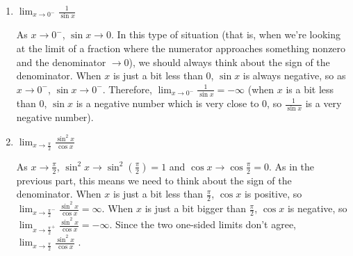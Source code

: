 \documentclass[main]{subfiles}
\begin{document}
\begin{enumerate}
\begin{enumerate}
    \item


      \begin{problem}[\vfill]
        $\displaystyle \lim_{x\to 0^-} \frac{1}{ \sin x}$
      \end{problem}

      \begin{solution}
        As $x \to 0^-$, $\sin x \to 0$.  In this type of situation (that
        is, when we're looking at the limit of a fraction where the
        numerator approaches something nonzero and the denominator $\to
        0$), we should always think about the sign of the denominator.
        When $x$ is just a bit less than 0, $\sin x$ is always negative,
        so as $x \to 0^-$, $\sin x \to 0^-$.  Therefore, $\displaystyle
        \lim_{x\to 0^-} \frac{1}{ \sin x} = \boxed{-\infty}$ (when $x$ is
        a bit less than 0, $\sin x$ is a negative number which is very
        close to 0, so $\frac{1}{\sin x}$ is a very negative number).
      \end{solution}

    \item
      \begin{problem}[\vfill]
        $\displaystyle \lim_{x\to \frac{\pi}{2}} \frac{ \sin^2 x}{\cos x}
        $
      \end{problem}

      \begin{solution}
        As $x \to \frac{\pi}{2}$, $\sin^2 x \to \sin^2 \left(
          \frac{\pi}{2} \right) = 1$ and $\cos x \to \cos \frac{\pi}{2} =
        0$.  As in the previous part, this means we need to think about
        the sign of the denominator.  When $x$ is just a bit less than
        $\frac{\pi}{2}$, $\cos x$ is positive, so $\displaystyle \lim_{x
          \to \frac{\pi}{2}^-} \frac{ \sin^2 x}{\cos x} = \infty$.  When
        $x$ is just a bit bigger than $\frac{\pi}{2}$, $\cos x$ is
        negative, so $\displaystyle \lim_{x
          \to \frac{\pi}{2}^+} \frac{ \sin^2 x}{\cos x} = -\infty$.  Since
        the two one-sided limits don't agree, $\displaystyle \lim_{x\to
          \frac{\pi}{2}} \frac{ \sin^2 x}{\cos x}$ . 
      \end{solution}

    \end{enumerate}    
  

\end{enumerate}
\end{document}

